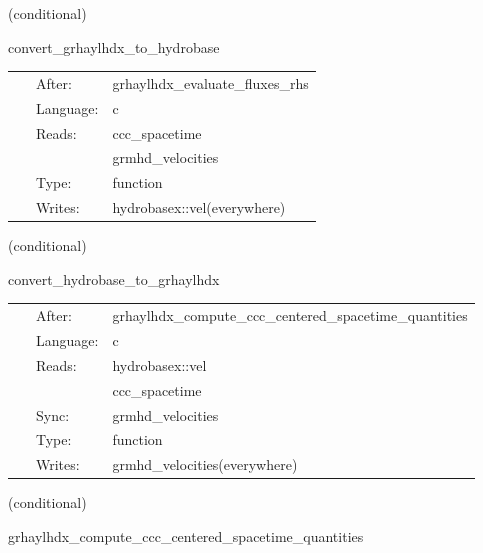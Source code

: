 \documentclass{article}
\begin{document}
   (conditional) 

\hspace{5mm} convert\_grhaylhdx\_to\_hydrobase 

\hspace{5mm}{\it convert grhaylhdx variables to hydrobasex } 


\hspace{5mm}

 \begin{tabular*}{160mm}{cll} 
~ & After:  & grhaylhdx\_evaluate\_fluxes\_rhs \\ 
~ & Language:  & c \\ 
~ & Reads:  & ccc\_spacetime \\ 
~& ~ &grmhd\_velocities\\ 
~ & Type:  & function \\ 
~ & Writes:  & hydrobasex::vel(everywhere) \\ 
\end{tabular*} 


\vspace{5mm}

   (conditional) 

\hspace{5mm} convert\_hydrobase\_to\_grhaylhdx 

\hspace{5mm}{\it convert hydrobasex initial data to grhaylhdx variables } 


\hspace{5mm}

 \begin{tabular*}{160mm}{cll} 
~ & After:  & grhaylhdx\_compute\_ccc\_centered\_spacetime\_quantities \\ 
~ & Language:  & c \\ 
~ & Reads:  & hydrobasex::vel \\ 
~& ~ &ccc\_spacetime\\ 
~ & Sync:  & grmhd\_velocities \\ 
~ & Type:  & function \\ 
~ & Writes:  & grmhd\_velocities(everywhere) \\ 
\end{tabular*} 


\vspace{5mm}

   (conditional) 

\hspace{5mm} grhaylhdx\_compute\_ccc\_centered\_spacetime\_quantities 
\end{document}

